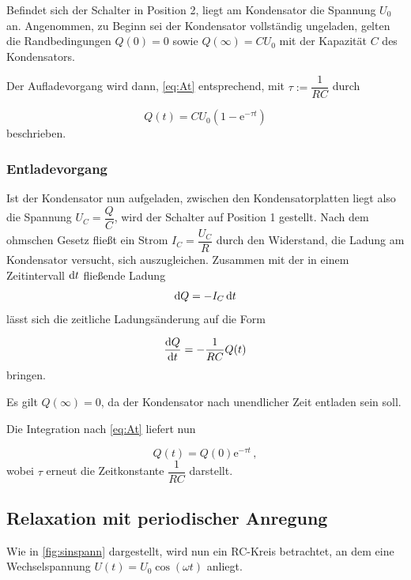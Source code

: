 Befindet sich der Schalter in Position 2, liegt am Kondensator die Spannung $U_0$ an.
Angenommen, zu Beginn sei der Kondensator vollständig ungeladen, gelten die Randbedingungen $Q(0) = 0$ sowie $Q(\infty) = C U_0$ mit der Kapazität $C$ des Kondensators.

Der Aufladevorgang wird dann, \eqref{eq:At} entsprechend, mit $τ := \dfrac{1}{RC}$ durch

\begin{equation}
    Q(t) = C U_0 (1 - \text{e}^{-τ t})
    \label{eq:aufladung}
\end{equation} beschrieben.


\subsubsection{Entladevorgang}

Ist der Kondensator nun aufgeladen, zwischen den Kondensatorplatten liegt also die Spannung $U_C = \dfrac{Q}{C}$, wird der Schalter auf Position 1 gestellt.
Nach dem ohmschen Gesetz fließt ein Strom $I_C = \dfrac{U_C}{R}$ durch den Widerstand, die Ladung am Kondensator versucht, sich auszugleichen.
Zusammen mit der in einem Zeitintervall $\mathrm{d} t$ fließende Ladung
\begin{equation}
    \mathrm{d} Q = -I_C \,\mathrm{d} t
    \label{eq:difQ}
\end{equation} lässt sich die zeitliche Ladungsänderung auf die Form

\begin{equation}
    \frac{\mathrm{d} Q}{\mathrm{d} t} = -\frac{1}{RC} Q(t)
\end{equation} bringen.

Es gilt $Q(\infty) = 0$, da der Kondensator nach unendlicher Zeit entladen sein soll.

Die Integration nach \eqref{eq:At} liefert nun

\begin{equation}
    Q(t) = Q(0) \text{e}^{-τ t}\,,
\end{equation} wobei $τ$ erneut die Zeitkonstante $\dfrac{1}{RC}$ darstellt.


\subsection{Relaxation mit periodischer Anregung}

Wie in \autoref{fig:sinspann} dargestellt, wird nun ein RC-Kreis betrachtet, an dem eine Wechselspannung $U(t) = U_0 \cos(ω t)$ anliegt.


